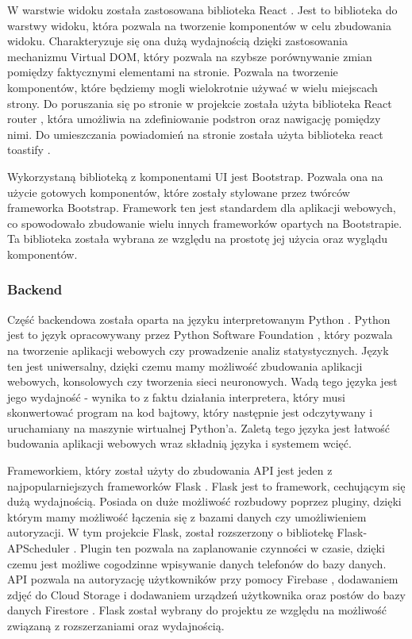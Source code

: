 W warstwie widoku została zastosowana biblioteka React \cite{React}. Jest to biblioteka do warstwy widoku, która pozwala na tworzenie komponentów w celu zbudowania widoku. Charakteryzuje się ona dużą wydajnością dzięki zastosowania mechanizmu Virtual DOM, który pozwala na szybsze porównywanie zmian pomiędzy faktycznymi elementami na stronie. Pozwala na tworzenie komponentów, które będziemy mogli wielokrotnie używać w wielu miejscach strony. Do poruszania się po stronie w projekcie została użyta biblioteka React router \cite{react_router}, która umożliwia na zdefiniowanie podstron oraz nawigację pomiędzy nimi. Do umieszczania powiadomień na stronie została użyta biblioteka react toastify \cite{react_toastify}.

Wykorzystaną biblioteką z komponentami UI jest Bootstrap. Pozwala ona na użycie gotowych komponentów, które zostały stylowane przez twórców frameworka Bootstrap. Framework ten jest standardem dla aplikacji webowych, co spowodowało zbudowanie wielu innych frameworków opartych na Bootstrapie. Ta biblioteka została wybrana ze względu na prostotę jej użycia oraz wyglądu komponentów. 

\subsubsection{Backend}
Część backendowa została oparta na języku interpretowanym Python \cite{python}. Python jest to język opracowywany przez Python Software Foundation \cite{psf}, który pozwala na tworzenie aplikacji webowych czy prowadzenie analiz statystycznych. Język ten jest uniwersalny, dzięki czemu mamy możliwość zbudowania aplikacji webowych, konsolowych czy tworzenia sieci neuronowych. Wadą tego języka jest jego wydajność - wynika to z faktu działania interpretera, który musi skonwertować program na kod bajtowy, który następnie jest odczytywany i uruchamiany na maszynie wirtualnej Python'a. Zaletą tego języka jest łatwość budowania aplikacji webowych wraz składnią języka i systemem wcięć.

Frameworkiem, który został użyty do zbudowania API jest jeden z najpopularniejszych frameworków Flask \cite{flask}. Flask jest to framework, cechującym się dużą wydajnością. Posiada on duże możliwość rozbudowy poprzez pluginy, dzięki którym mamy możliwość łączenia się z bazami danych czy umożliwieniem autoryzacji. W tym projekcie Flask, został rozszerzony o bibliotekę Flask-APScheduler \cite{flask_apscheduler}. Plugin ten pozwala na zaplanowanie czynności w czasie, dzięki czemu jest możliwe cogodzinne wpisywanie danych telefonów do bazy danych. API pozwala na autoryzację użytkowników przy pomocy Firebase \cite{firebase}, dodawaniem zdjęć do Cloud Storage \cite{cloud_storage} i dodawaniem urządzeń użytkownika oraz postów do bazy danych Firestore \cite{firestore}. Flask został wybrany do projektu ze względu na możliwość związaną z rozszerzaniami oraz wydajnością.

